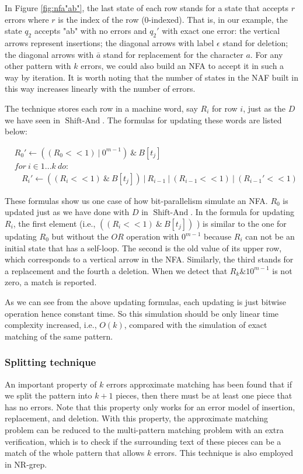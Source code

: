In Figure \ref{fig:nfa"ab"}, the last state of each row stands for a state that accepts $r$ errors where $r$ is the index of the row (0-indexed). That is, in our example, the state $q_2$ accepts "ab" with no errors and $q_2'$  with exact one error: the vertical arrows represent insertions; the diagonal arrows with label $\epsilon$ stand for deletion; the diagonal arrows with $\bar{a}$ stand for replacement for the character $a$. For any other pattern with $k$ errors, we could also build an NFA to accept it in such a way by iteration. It is worth noting that the number of states in the NAF built in this way increases linearly with the number of errors.

The technique stores each row in a machine word, say $R_i$ for row $i$, just as the $D$ we have seen in $\operatorname{Shift-And}$.
The formulas for updating these words are listed below:

\begin{align*}
&R_0' \leftarrow  ((R_0 << 1) \ |\ 0^{m-1}) \ \& \ B[t_j] \\
&for \ i \in 1...k \ do:  \\
&\ \ \ \ R_i' \leftarrow ((R_i << 1) \ \& \ B[t_j] ) \ |\ R_{i-1} \ | \ (R_{i-1} << 1 ) \ |\ (R_{i-1}' << 1)
\end{align*}

These formulas show us one case of how bit-parallelism simulate an NFA. $R_0$ is updated just as we have done with $D$ in $\operatorname{Shift-And}$. In the formula for updating $R_i$, the first element (i.e., $((R_i << 1) \ \& \ B[t_j] ) $ ) is similar to the one for updating $R_0$  but without the $OR$ operation with $0^{m-1}$ because $R_i$ can not be an initial state that has a self-loop. The second is the old value of its upper row, which corresponds to a vertical arrow in the NFA. Similarly, the third stands for a replacement and the fourth a deletion. When we detect that $R_k \& 10^{m-1}$ is not zero, a match is reported.  

As we can see from the above updating formulas, each updating is just bitwise operation hence constant time. So this simulation should be only linear time complexity increased, i.e., $O(k)$, compared with the simulation of exact matching of the same pattern.


\subsubsection{Splitting technique}
An important property of $k$ errors approximate matching has been found that if we split the pattern into $k+1$ pieces, then there must be at least one piece that has no errors\cite{wu1992}. Note that this property only works for an error model of insertion, replacement, and deletion. With this property, the approximate matching problem can be reduced to the multi-pattern matching problem with an extra verification, which is to check if the surrounding text of these pieces can be a match of the whole pattern that allows $k$ errors. This technique is also employed in NR-grep. 
